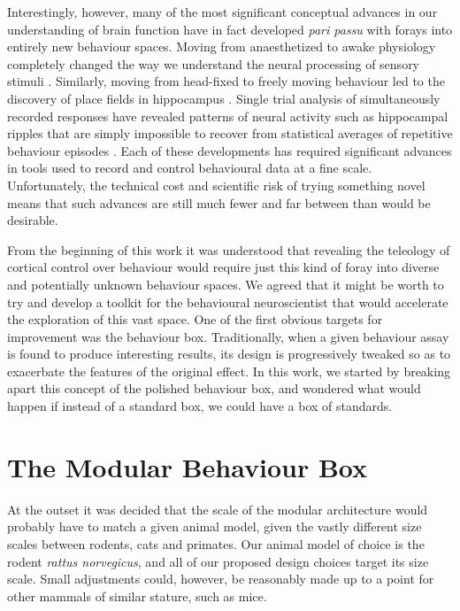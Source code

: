 Interestingly, however, many of the most significant conceptual advances in our understanding of brain function have in fact developed \emph{pari passu} with forays into entirely new behaviour spaces. Moving from anaesthetized to awake physiology completely changed the way we understand the neural processing of sensory stimuli \cite{Sellers2015}. Similarly, moving from head-fixed to freely moving behaviour led to the discovery of place fields in hippocampus \cite{OKeefe1971}. Single trial analysis of simultaneously recorded responses have revealed patterns of neural activity such as hippocampal ripples that are simply impossible to recover from statistical averages of repetitive behaviour episodes \cite{Foster2006,Davidson2009}. Each of these developments has required significant advances in tools used to record and control behavioural data at a fine scale. Unfortunately, the technical cost and scientific risk of trying something novel means that such advances are still much fewer and far between than would be desirable.

From the beginning of this work it was understood that revealing the teleology of cortical control over behaviour would require just this kind of foray into diverse and potentially unknown behaviour spaces. We agreed that it might be worth to try and develop a toolkit for the behavioural neuroscientist that would accelerate the exploration of this vast space. One of the first obvious targets for improvement was the behaviour box. Traditionally, when a given behaviour assay is found to produce interesting results, its design is progressively tweaked so as to exacerbate the features of the original effect. In this work, we started by breaking apart this concept of the polished behaviour box, and wondered what would happen if instead of a standard box, we could have a box of standards.

\section{The Modular Behaviour Box}

At the outset it was decided that the scale of the modular architecture would probably have to match a given animal model, given the vastly different size scales between rodents, cats and primates. Our animal model of choice is the rodent \emph{rattus norvegicus}, and all of our proposed design choices target its size scale. Small adjustments could, however, be reasonably made up to a point for other mammals of similar stature, such as mice.

